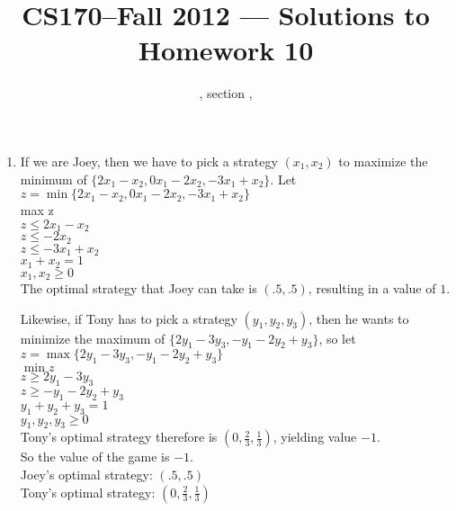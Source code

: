 \documentclass[11pt]{article}
\title{CS170--Fall 2012 --- Solutions to Homework 10}
\author{\Name, section \Sec, \texttt{\Login}}
\begin{document}
\maketitle
\begin{enumerate}
\item If we are Joey, then we have to pick a strategy $(x_1,x_2)$ to maximize the minimum of $\{2x_1-x_2,0x_1-2x_2,-3x_1+x_2\}$. Let $z=\min\{2x_1-x_2,0x_1-2x_2,-3x_1+x_2\}$\\
max z\\
$z \le 2x_1-x_2$\\
$z \le -2x_2$\\
$z \le -3x_1+x_2$\\
$x_1+x_2=1$\\
$x_1,x_2 \ge 0$\\
The optimal strategy that Joey can take is $(.5,.5)$, resulting in a value of $1$.

Likewise, if Tony has to pick a strategy $(y_1,y_2,y_3)$, then he wants to minimize the maximum of $\{2y_1-3y_3,-y_1-2y_2+y_3\}$, so let $z=\max\{2y_1-3y_3,-y_1-2y_2+y_3\}$\\
$\min z$\\
$z \ge 2y_1-3y_3$\\
$z \ge -y_1-2y_2+y_3$\\
$y_1+y_2+y_3=1$\\
$y_1,y_2,y_3\ge 0$\\
Tony's optimal strategy therefore is $(0,\frac{2}{3}, \frac{1}{3})$, yielding value $-1$. \\
So the value of the game is $-1$.\\
Joey's optimal strategy: $(.5,.5)$\\
Tony's optimal strategy: $(0,\frac{2}{3}, \frac{1}{3})$

\newpage


\end{enumerate}
\end{document}
